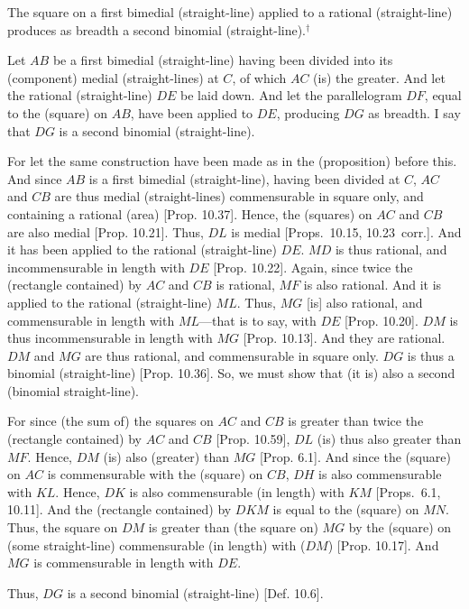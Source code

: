 \begin{Parallel}{}{}
{The square on a first bimedial (straight-line)
applied to a rational (straight-line) produces as breadth a second binomial
(straight-line).$^\dag$

\epsfysize=1.55in
\centerline{}

Let $AB$ be a first bimedial (straight-line) having been divided into its (component)
medial (straight-lines) at $C$, of which $AC$ (is) the greater. And let
the rational (straight-line) $DE$ be laid down. And let the parallelogram
$DF$, equal to the (square) on $AB$, have been applied to $DE$, producing
$DG$ as breadth. I say that $DG$ is a second binomial (straight-line).

For let the same construction have been made as in the (proposition) before
this. And since $AB$ is a first bimedial (straight-line), having been divided at $C$, 
$AC$ and $CB$ are thus medial (straight-lines) commensurable
in square only, and containing a rational (area) [Prop. 10.37]. Hence, the (squares) on $AC$ and
$CB$ are also medial [Prop. 10.21]. Thus,
$DL$ is medial [Props.~10.15, 10.23~corr.].  And it has been applied to the
rational (straight-line) $DE$. $MD$ is thus rational, and incommensurable
in length with $DE$ [Prop. 10.22]. Again,
since twice the (rectangle contained) by $AC$ and $CB$ is rational,
$MF$ is also rational. And it is applied to the rational (straight-line)
$ML$. Thus, $MG$ [is] also rational, and commensurable in length
with $ML$---that is to say, with $DE$ [Prop. 10.20]. $DM$ is thus incommensurable in length with $MG$ [Prop. 10.13]. And they are rational. $DM$ and $MG$ are thus rational, and commensurable in square only. $DG$ is thus a binomial (straight-line) [Prop. 10.36]. So, we must show that (it
is) also a second (binomial straight-line).

For since (the sum of) the squares on $AC$ and $CB$ is greater than twice
the (rectangle contained) by $AC$ and $CB$ [Prop. 10.59], $DL$ (is) thus also greater
than $MF$. Hence, $DM$ (is) also (greater) than $MG$ [Prop. 6.1]. And since
the (square) on $AC$ is commensurable with the (square) on $CB$, $DH$
is also commensurable with $KL$. Hence, $DK$ is also commensurable
(in length) with $KM$ [Props.~6.1, 10.11].  And the (rectangle contained) by $DKM$
is equal to the (square) on $MN$. Thus, the square on $DM$ is greater
than (the square on) $MG$ by the (square) on (some straight-line)
commensurable (in length) with ($DM$) [Prop. 10.17]. And $MG$ is commensurable in length
with $DE$.

Thus, $DG$ is a second binomial (straight-line) [Def. 10.6].}
\end{Parallel}


